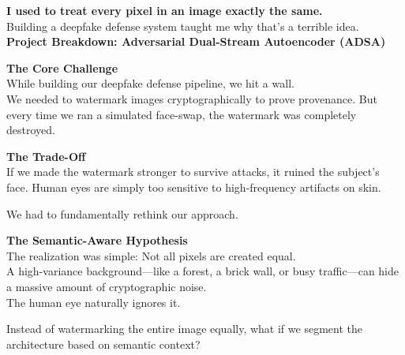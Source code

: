 \documentclass{article}
\begin{document}
\pagecolor{white}
\color{brandnavy}

\thispagestyle{empty}
\vspace*{1.5in}
{\Huge \textbf{I used to treat every pixel in an image exactly the same.}}\\[0.8in]
{\Large Building a deepfake defense system taught me why that’s a terrible idea.}\\[1in]
\vspace*{1.5in}
{\Large \textbf{Project Breakdown: Adversarial Dual-Stream Autoencoder (ADSA)}}
\newpage

\thispagestyle{empty}
\vspace*{1in}
{\Huge \textbf{The Core Challenge}}\\[0.5in]
{\Large While building our deepfake defense pipeline, we hit a wall.}\\[0.3in]
{\Large We needed to watermark images cryptographically to prove provenance. But every time we ran a simulated face-swap, the watermark was completely destroyed.}\\[0.5in]

\begin{darkbox}
{\Large \textbf{The Trade-Off}}\\
If we made the watermark stronger to survive attacks, it ruined the subject's face. Human eyes are simply too sensitive to high-frequency artifacts on skin.
\end{darkbox}
\vspace*{0.5in}
{\Large We had to fundamentally rethink our approach.}
\newpage

\thispagestyle{empty}
\vspace*{1in}
{\Huge \textbf{The Semantic-Aware Hypothesis}}\\[0.5in]
{\Large The realization was simple: Not all pixels are created equal.}\\[0.3in]
{\Large A high-variance background---like a forest, a brick wall, or busy traffic---can hide a massive amount of cryptographic noise.}\\[0.3in]
{\Large The human eye naturally ignores it.}\\[0.5in]

\begin{infobox}
{\Large Instead of watermarking the entire image equally, what if we segment the architecture based on semantic context?}
\end{infobox}
\newpage
\end{document}
